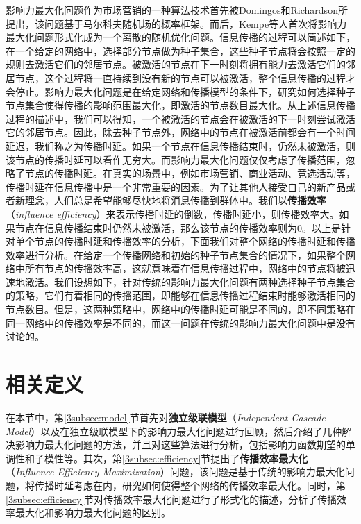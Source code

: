 影响力最大化问题作为市场营销的一种算法技术首先被Domingos和Richardson所提出，该问题基于马尔科夫随机场的概率框架。而后，Kempe等人首次将影响力最大化问题形式化成为一个离散的随机优化问题。信息传播的过程可以简述如下，在一个给定的网络中，选择部分节点做为种子集合，这些种子节点将会按照一定的规则去激活它们的邻居节点。被激活的节点在下一时刻将拥有能力去激活它们的邻居节点，这个过程将一直持续到没有新的节点可以被激活，整个信息传播的过程才会停止。影响力最大化问题是在给定网络和传播模型的条件下，研究如何选择种子节点集合使得传播的影响范围最大化，即激活的节点数目最大化。从上述信息传播过程的描述中，我们可以得知，一个被激活的节点会在被激活的下一时刻尝试激活它的邻居节点。因此，除去种子节点外，网络中的节点在被激活前都会有一个时间延迟，我们称之为传播时延。如果一个节点在信息传播结束时，仍然未被激活，则该节点的传播时延可以看作无穷大。而影响力最大化问题仅仅考虑了传播范围，忽略了节点的传播时延。在真实的场景中，例如市场营销、商业活动、竞选活动等，传播时延在信息传播中是一个非常重要的因素。为了让其他人接受自己的新产品或者新理念，人们总是希望能够尽快地将消息传播到群体中。我们以\textbf{传播效率}（\textit{influence efficiency}）来表示传播时延的倒数，传播时延小，则传播效率大。如果节点在信息传播结束时仍然未被激活，那么该节点的传播效率则为0。以上是针对单个节点的传播时延和传播效率的分析，下面我们对整个网络的传播时延和传播效率进行分析。在给定一个传播网络和初始的种子节点集合的情况下，如果整个网络中所有节点的传播效率高，这就意味着在信息传播过程中，网络中的节点将被迅速地激活。我们设想如下，针对传统的影响力最大化问题有两种选择种子节点集合的策略，它们有着相同的传播范围，即能够在信息传播过程结束时能够激活相同的节点数目。但是，这两种策略中，网络中的传播时延可能是不同的，即不同策略在同一网络中的传播效率是不同的，而这一问题在传统的影响力最大化问题中是没有讨论的。

\section{相关定义}
\label{3sec:definition}
在本节中，第\ref{3subsec:model}节首先对\textbf{独立级联模型}（\textit{Independent Cascade Model}）以及在独立级联模型下的影响力最大化问题进行回顾，然后介绍了几种解决影响力最大化问题的方法，并且对这些算法进行分析，包括影响力函数期望的单调性和子模性等。其次，第\ref{3subsec:efficiency}节提出了\textbf{传播效率最大化}（\textit{Influence Efficiency Maximization}）问题，该问题是基于传统的影响力最大化问题，将传播时延考虑在内，研究如何使得整个网络的传播效率最大化。同时，第\ref{3subsec:efficiency}节对传播效率最大化问题进行了形式化的描述，分析了传播效率最大化和影响力最大化问题的区别。

